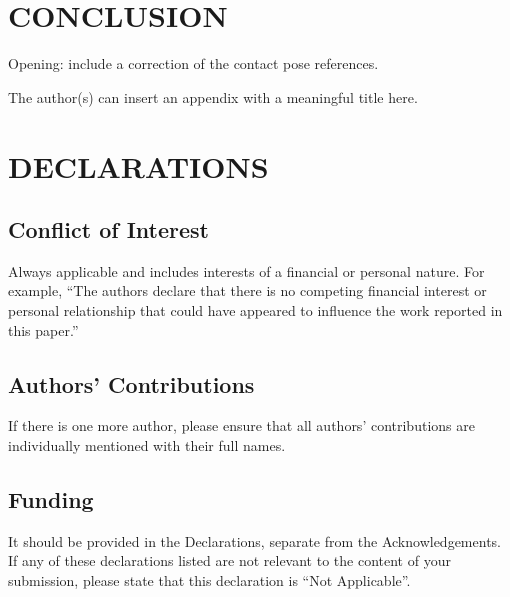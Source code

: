 \documentclass{IJCAS}
\begin{document}
\section{CONCLUSION}

Opening: include a correction of the contact pose references. 



\appendix

The author(s) can insert an appendix with a meaningful title here.



\section*{DECLARATIONS}

\subsection*{Conflict of Interest}
Always applicable and includes interests of a financial or personal nature. For example, ``The authors declare that there is no competing financial interest or personal relationship that could have appeared to influence the work reported in this paper.''

\subsection*{Authors' Contributions}
If there is one more author, please ensure that all authors' contributions are individually mentioned with their full names.

\subsection*{Funding }
It should be provided in the Declarations, separate from the Acknowledgements. If any of these declarations listed are not relevant to the content of your submission, please state that this declaration is ``Not Applicable''.
\end{document}
